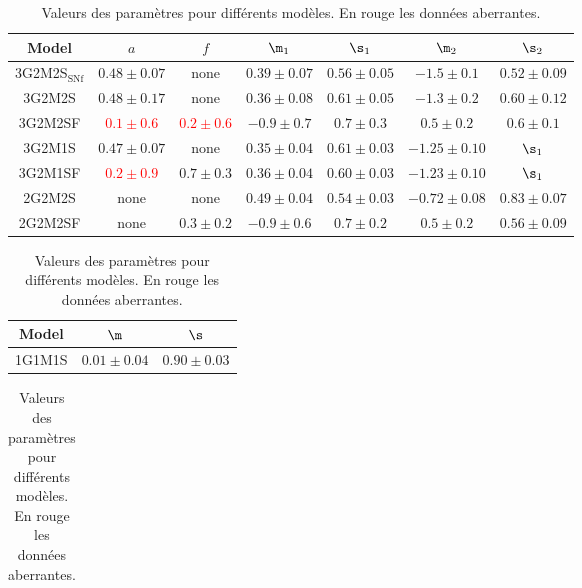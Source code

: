 \documentclass[bibnumber]{aa}
\begin{document}
\begin{table}[htbp!]
    \centering
    \caption{Valeurs des paramètres pour différents modèles. En rouge les
    données aberrantes.}
    \label{tab:val}
    \begin{tabular}{c c c c c c c}\hline\hline

        Model & $a$ & $f$ & $\m_1$ & $\s_1$ & $\m_2$ &
        $\s_2$ \\\hline

        3G2M2S$_{\mathrm{SNf}}$ & $0.48 \pm 0.07$ & none & $0.39 \pm 0.07$ &
        $0.56 \pm 0.05$ & $-1.5 \pm 0.1$ & $0.52 \pm 0.09$ \\

        3G2M2S & $0.48 \pm 0.17$ & none & $0.36 \pm 0.08$ & $0.61 \pm 0.05$ &
        $-1.3 \pm 0.2$ & $0.60 \pm 0.12$ \\

        3G2M2SF & \textcolor{red}{$0.1 \pm 0.6$} & \textcolor{red}{$0.2 \pm
        0.6$} & $-0.9 \pm 0.7$ & $0.7 \pm 0.3$ & $0.5 \pm 0.2$ & $0.6 \pm 0.1$
        \\

        3G2M1S & $0.47 \pm 0.07$ & none & $0.35 \pm 0.04$ & $0.61 \pm 0.03$ &
        $-1.25 \pm 0.10$ & $\s_1$ \\

        3G2M1SF & \textcolor{red}{$0.2 \pm 0.9$} & $0.7 \pm 0.3$ & $0.36 \pm
        0.04$ & $0.60 \pm 0.03$ & $-1.23 \pm 0.10$ & $\s_1$ \\

        2G2M2S & none & none & $0.49 \pm 0.04$ & $0.54 \pm 0.03$ & $-0.72 \pm
        0.08$ & $0.83 \pm 0.07$ \\
        
        2G2M2SF & none & $0.3 \pm 0.2$ & $-0.9 \pm 0.6$ & $0.7 \pm 0.2$ & $0.5
        \pm 0.2$ & $0.56 \pm 0.09$ \\\hline

    \end{tabular} \bigbreak

\begin{tabular}{c c c}\hline\hline

    Model & $\m$ & $\s$ \\\hline

    1G1M1S & $0.01 \pm 0.04$ & $0.90 \pm 0.03$ \\\hline

\end{tabular} \bigbreak

\begin{tabular}{c c c c c}\hline\hline


\end{tabular}
\end{table}
\end{document}
